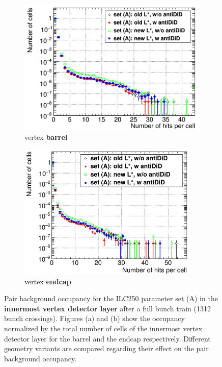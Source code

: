  \begin{figure}
 \centering
   \begin{subfigure}[b]{0.49\textwidth}
   \centering
    \includegraphics[width=\textwidth]{Figures/Pairs/Occupancy_Comparison_Layer_0_numcells_ILC250_Comparison_Set_A_All_SiD_designs_LEG.png}
       \caption{\sid vertex \textbf{barrel}}
   \end{subfigure}
   \hfill
    \begin{subfigure}[b]{0.49\textwidth}
   \centering
    \includegraphics[width=0.945\textwidth]{Figures/Pairs/Occupancy_Comparison_Layer_0_numcells_ILC250_Comparison_Set_A_All_SiD_designs_SiVertexEndcap.png}
       \caption{\sid vertex \textbf{endcap}}
   \end{subfigure}
   \caption[Pair background occupancy in the \sid vertex detector for the ILC250 set (A) for different \sid geometry variants]{Pair background occupancy for the ILC250 parameter set (A) in the \textbf{innermost \sid vertex detector layer} after a full bunch train (\num{1312} bunch crossings).
   Figures (a) and (b) show the occupancy normalized by the total number of cells of the innermost vertex detector layer for the barrel and the endcap respectively.
   Different \sid geometry variants are compared regarding their effect on the pair background occupancy.
   }
   \label{fig:PairBkg:ILC250_Occupancy_SetA}
 \end{figure}

